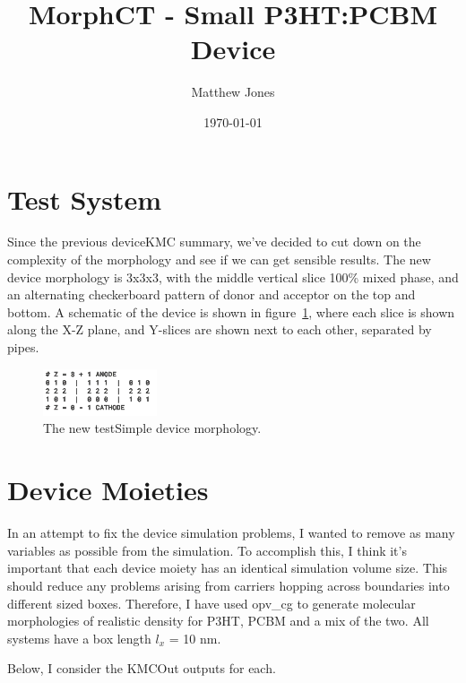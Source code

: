 \documentclass[12pt]{article}
\title{MorphCT - Small P3HT:PCBM Device}
\author{Matthew Jones}
\date{\today}
\begin{document}
\maketitle


\section{Test System}

Since the previous deviceKMC summary, we've decided to cut down on the complexity of the morphology and see if we can get sensible results.
The new device morphology is 3x3x3, with the middle vertical slice 100\% mixed phase, and an alternating checkerboard pattern of donor and acceptor on the top and bottom.
A schematic of the device is shown in figure~\ref{fig:device}, where each slice is shown along the X-Z plane, and Y-slices are shown next to each other, separated by pipes.


\begin{figure}[h!]\centering
	\includegraphics[width=0.3\textwidth]{Figures/device.png}
    \caption{The new testSimple device morphology.}
	\label{fig:device}
\end{figure}


\section{Device Moieties}

In an attempt to fix the device simulation problems, I wanted to remove as many variables as possible from the simulation.
To accomplish this, I think it's important that each device moiety has an identical simulation volume size. This should reduce any problems arising from carriers hopping across boundaries into different sized boxes.
Therefore, I have used opv\_cg to generate molecular morphologies of realistic density for P3HT, PCBM and a mix of the two.
All systems have a box length $l_{x}$ = 10 nm.


Below, I consider the KMCOut outputs for each.
\end{document}
